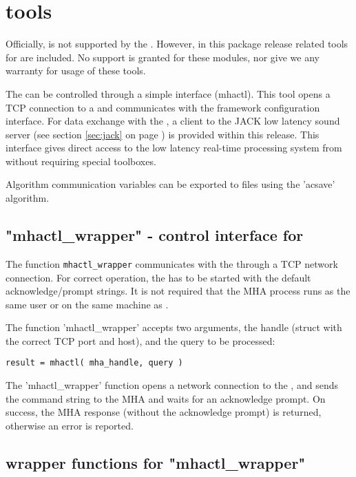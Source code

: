 \section{\Matlab{} tools}%
\label{sec:matlab}%

Officially, \Matlab{} is not supported by the \mha{}.
%
However, in this
package release \mha{} related tools for \Matlab{} are included.
%
No support
is granted for these modules, nor give we any warranty for usage of
these tools.

The \mhad{} can be controlled through a simple \Matlab{}
interface (mhactl). This tool opens a TCP connection to a \mhad{} and
communicates with the framework configuration interface.
%
For data exchange with the \mha{}, a \Matlab{} client to the JACK low
latency sound server (see section \ref{sec:jack} on page
\pageref{sec:jack}) is provided within this release.
%
This interface gives direct access to the low latency real-time
processing system from \Matlab{} without requiring special toolboxes.

Algorithm communication variables can be exported to \Matlab{} files
using the 'acsave' algorithm.

\subsection{"mhactl\_wrapper" - \mha{} control interface for \Matlab{}}
\label{sec:mhactl}

The \Matlab{} function \verb!mhactl_wrapper! communicates with the \mhad{}
through a TCP network connection.
%
For correct operation, the \mhad{} has to be started with the
default acknowledge/prompt strings.
%
It is not required that the MHA process runs as the same user or on
the same machine as \Matlab{}.

The function 'mhactl\_wrapper' accepts two arguments, the \mha{} handle 
(struct with the correct TCP port and host), and the \mha{} query to be processed:
\begin{verbatim}result = mhactl( mha_handle, query )\end{verbatim}
%
The 'mhactl\_wrapper' function opens a network connection to the \mhad{},
and sends the command string to the MHA and waits for an acknowledge
prompt.
%
On success, the MHA response (without the acknowledge prompt) is
returned, otherwise an error is reported.

\subsection{\Matlab{} wrapper functions for "mhactl\_wrapper"}
\label{sec:mhactl_wrapper}

